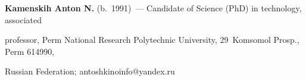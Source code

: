 \vspace*{3pt}



\noindent

\textbf{Kamenskih Anton N.} (b.\ 1991)~--- Candidate of Science (PhD) in technology, associated 

professor, Perm National Research Polytechnic University, 29~Komsomol Prosp., Perm 614990, 

Russian Federation; \mbox{antoshkinoinfo@yandex.ru}





  

\label{end\stat}



\renewcommand{\bibname}{\protect\rm Литература} 

